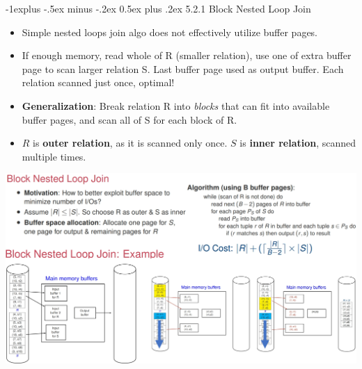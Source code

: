 \documentclass[10pt, landscape]{article}
\makeatletter
\renewcommand{\subsection}{\@startsection{subsection}{2}{0mm}%
                                {-1explus -.5ex minus -.2ex}%
                                {0.5ex plus .2ex}%
                                {\normalfont\normalsize\bfseries}}
\makeatother
\begin{document}
\begin{multicols*}{3}
\subsection{5.2.1 Block Nested Loop Join}
\begin{itemize}
\item Simple nested loops join algo does not effectively utilize buffer pages.
\item If enough memory, read whole of R (smaller relation), use one of extra buffer page to scan larger relation S. Last buffer page used as output buffer. Each relation scanned just once, optimal!
\item \textbf{Generalization}: Break relation R into \textit{blocks} that can fit into available buffer pages, and scan all of S for each block of R. 
\item $R$ is \textbf{outer relation}, as it is scanned only once. $S$ is \textbf{inner relation}, scanned multiple times.
\end{itemize}
\centerline{\includegraphics[width = 1\linewidth]{blockedNestedLoop}}


\end{multicols*}
\end{document}
